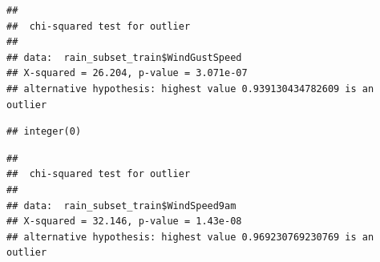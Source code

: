 \documentclass[
]{article}
\newenvironment{Shaded}{\begin{snugshade}}{\end{snugshade}}
\newcommand{\AttributeTok}[1]{\textcolor[rgb]{0.77,0.63,0.00}{#1}}
\newcommand{\CommentTok}[1]{\textcolor[rgb]{0.56,0.35,0.01}{\textit{#1}}}
\newcommand{\DecValTok}[1]{\textcolor[rgb]{0.00,0.00,0.81}{#1}}
\newcommand{\FloatTok}[1]{\textcolor[rgb]{0.00,0.00,0.81}{#1}}
\newcommand{\FunctionTok}[1]{\textcolor[rgb]{0.00,0.00,0.00}{#1}}
\newcommand{\NormalTok}[1]{#1}
\newcommand{\OtherTok}[1]{\textcolor[rgb]{0.56,0.35,0.01}{#1}}
\newcommand{\SpecialCharTok}[1]{\textcolor[rgb]{0.00,0.00,0.00}{#1}}
\newcommand{\StringTok}[1]{\textcolor[rgb]{0.31,0.60,0.02}{#1}}
\begin{document}
\begin{verbatim}
## 
##  chi-squared test for outlier
## 
## data:  rain_subset_train$WindGustSpeed
## X-squared = 26.204, p-value = 3.071e-07
## alternative hypothesis: highest value 0.939130434782609 is an outlier
\end{verbatim}

\begin{Shaded}
\end{Shaded}

\begin{verbatim}
## integer(0)
\end{verbatim}

\begin{Shaded}
\end{Shaded}

\begin{verbatim}
## 
##  chi-squared test for outlier
## 
## data:  rain_subset_train$WindSpeed9am
## X-squared = 32.146, p-value = 1.43e-08
## alternative hypothesis: highest value 0.969230769230769 is an outlier
\end{verbatim}

\begin{Shaded}
\end{Shaded}
\end{document}
